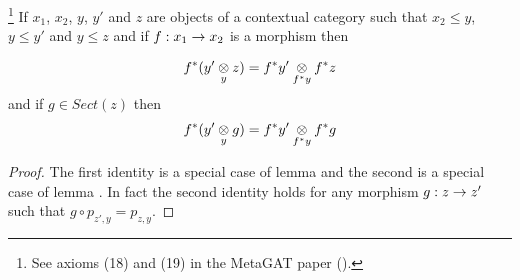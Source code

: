 \begin{lemma}
\footnote{See axioms (18) and (19) in the MetaGAT paper (\cite{CartmellMetaTheory}).}
If  $x_1$, $x_2$, $y$, $y'$ and $z$ are objects of a contextual category \catcw such that
$x_2 \leq y$, $y \leq y'$ and $y \leq z$ and if $f: x_1 \morph x_2$ is a morphism
then

\begin{equation*}
f^*(\crossx{y'}{z}{y})=\crossx{f^*y'}{f^*z}{f^*y}
\end{equation*}
and if $g \in Sect(z)$ then
\begin{equation*}
f^*(\crossx{y'}{g}{y})=\crossx{f^*y'}{f^*g}{f^*y}
\end{equation*}
\end{lemma}
\begin{proof}
The first identity is a special case of lemma  and the second is a special case of
lemma . 
In fact the second identity holds for any morphism $g:z \morph z'$ such that $g \circ p_{z',y} = p_{z,y}$.
\end{proof}

